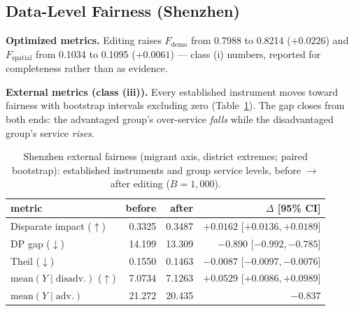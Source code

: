\subsection{Data-Level Fairness (Shenzhen)}\label{sec:exp-data-level}

\textbf{Optimized metrics.} Editing raises $F_{\mathrm{demo}}$ from 0.7988
to 0.8214 ($+0.0226$) and $F_{\mathrm{spatial}}$ from 0.1034 to 0.1095
($+0.0061$) --- class (i) numbers, reported for completeness rather than as
evidence.

\textbf{External metrics (class (iii)).} Every established instrument moves
toward fairness with bootstrap intervals excluding zero
(Table~\ref{tab:external-sz}). The gap closes from both
ends: the advantaged group's over-service \emph{falls} while the disadvantaged
group's service \emph{rises}.

\begin{table}[t]
\centering
\caption{Shenzhen external fairness (migrant axis, district extremes; paired
bootstrap): established instruments and group service levels, before $\to$
after editing ($B{=}1{,}000$).}
\label{tab:external-sz}
\footnotesize
\setlength{\tabcolsep}{4pt}
\begin{tabular}{lrrr}
\toprule
metric & before & after & $\Delta$ [95\% CI] \\
\midrule
Disparate impact ($\uparrow$) & 0.3325 & 0.3487 & $+0.0162$ [$+0.0136, +0.0189$] \\
DP gap ($\downarrow$) & 14.199 & 13.309 & $-0.890$ [$-0.992, -0.785$] \\
Theil ($\downarrow$) & 0.1550 & 0.1463 & $-0.0087$ [$-0.0097, -0.0076$] \\
$\mathrm{mean}(Y \mid \mathrm{disadv.})$ ($\uparrow$) & 7.0734 & 7.1263 & $+0.0529$ [$+0.0086, +0.0989$] \\
$\mathrm{mean}(Y \mid \mathrm{adv.})$ & 21.272 & 20.435 & $-0.837$ \\
\bottomrule
\end{tabular}
\end{table}

